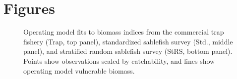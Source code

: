 \documentclass[11pt]{book}
\begin{document}
\hypertarget{figures}{%
\section{Figures}\label{figures}}
\begin{figure}[htb]

{\centering {} 

}

\caption{Operating model fits to biomass indices from the commercial trap fishery (Trap, top panel), standardized sablefish survey (Std., middle panel), and stratified random sablefish survey (StRS, bottom panel). Points show observations scaled by catchability, and lines show operating model vulnerable biomass.}\label{fig:unnamed-chunk-13}
\end{figure}
\newpage
\end{document}
